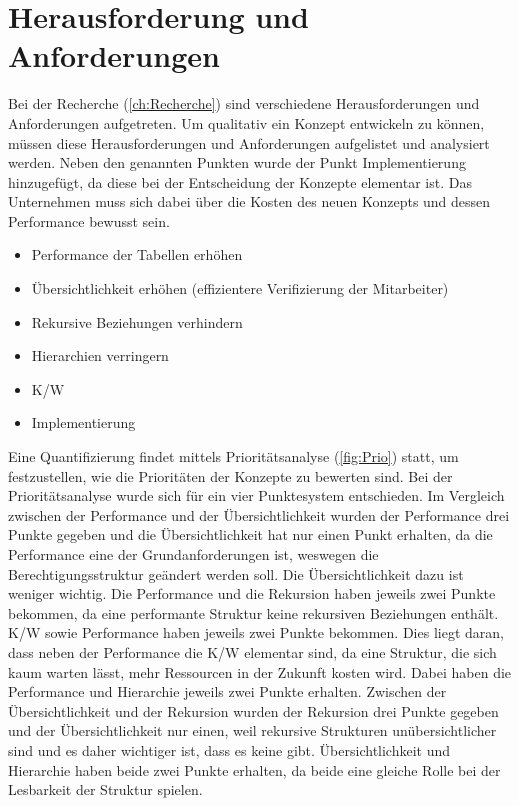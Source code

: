 \section{Herausforderung und Anforderungen}
\label{sec:chapter04:Herausforderung}
Bei der Recherche (\ref{ch:Recherche}) sind verschiedene Herausforderungen und Anforderungen aufgetreten.
Um qualitativ ein Konzept entwickeln zu können, müssen diese Herausforderungen und Anforderungen aufgelistet und analysiert werden.
Neben den genannten Punkten wurde der Punkt Implementierung hinzugefügt, da diese bei der Entscheidung der Konzepte elementar ist.
Das Unternehmen muss sich dabei über die Kosten des neuen Konzepts und dessen Performance bewusst sein.
\begin{itemize}
	\item Performance der Tabellen erhöhen 
	\item Übersichtlichkeit erhöhen (effizientere Verifizierung der Mitarbeiter)
	\item Rekursive Beziehungen verhindern
	\item Hierarchien verringern
	\item \ac{K/W}
	\item Implementierung
\end{itemize}
Eine Quantifizierung findet mittels Prioritätsanalyse (\ref{fig:Prio}) statt, um festzustellen, wie die Prioritäten der Konzepte zu bewerten sind. \cite{BdIufH}
Bei der Prioritätsanalyse wurde sich für ein vier Punktesystem entschieden.
\newline
Im Vergleich zwischen der Performance und der Übersichtlichkeit wurden der Performance drei Punkte gegeben und die Übersichtlichkeit hat nur einen Punkt erhalten, da die Performance eine der Grundanforderungen ist, weswegen die Berechtigungsstruktur geändert werden soll.
Die Übersichtlichkeit dazu ist weniger wichtig.
Die Performance und die Rekursion haben jeweils zwei Punkte bekommen, da eine performante Struktur keine rekursiven Beziehungen enthält.
\ac{K/W} sowie Performance haben jeweils zwei Punkte bekommen.
Dies liegt daran, dass neben der Performance die \ac{K/W} elementar sind, da eine Struktur, die sich kaum warten lässt, mehr Ressourcen in der Zukunft kosten wird.
Dabei haben die Performance und Hierarchie jeweils zwei Punkte erhalten.
Zwischen der Übersichtlichkeit und der Rekursion wurden der Rekursion drei Punkte gegeben und der Übersichtlichkeit nur einen, weil rekursive Strukturen unübersichtlicher sind und es daher wichtiger ist, dass es keine gibt.
Übersichtlichkeit und Hierarchie haben beide zwei Punkte erhalten, da beide eine gleiche Rolle bei der Lesbarkeit der Struktur spielen.
